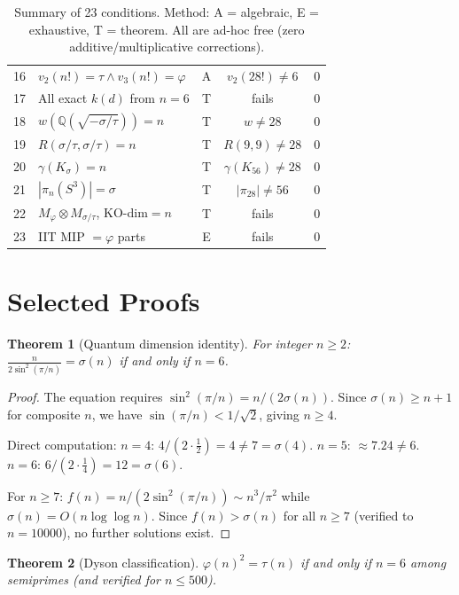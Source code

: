 \documentclass[11pt,a4paper]{article}
\newtheorem{theorem}{Theorem}
\begin{document}
\begin{table}[h!]
\begin{tabular}{@{}clccc@{}}
16 & $v_2(n!)=\tau \wedge v_3(n!)=\varphi$ & A & $v_2(28!)\neq 6$ & 0 \\
17 & All exact $k(d)$ from $n=6$ & T & fails & 0 \\
18 & $w(\mathbb{Q}(\sqrt{-\sigma/\tau})) = n$ & T & $w\neq 28$ & 0 \\
19 & $R(\sigma/\tau,\sigma/\tau) = n$ & T & $R(9,9)\neq 28$ & 0 \\
20 & $\gamma(K_\sigma) = n$ & T & $\gamma(K_{56})\neq 28$ & 0 \\
21 & $|\pi_n(S^3)| = \sigma$ & T & $|\pi_{28}|\neq 56$ & 0 \\
22 & $M_\varphi \otimes M_{\sigma/\tau}$, KO-dim$=n$ & T & fails & 0 \\
23 & IIT MIP $= \varphi$ parts & E & fails & 0 \\
\bottomrule
\end{tabular}
\caption{Summary of 23 conditions. Method: A = algebraic, E = exhaustive, T = theorem. All are ad-hoc free (zero additive/multiplicative corrections).}
\end{table}

\section{Selected Proofs}

\begin{theorem}[Quantum dimension identity]
For integer $n \ge 2$: $\frac{n}{2\sin^2(\pi/n)} = \sigma(n)$ if and only if $n = 6$.
\end{theorem}

\begin{proof}
The equation requires $\sin^2(\pi/n) = n/(2\sigma(n))$. Since $\sigma(n) \ge n+1$ for composite $n$, we have $\sin(\pi/n) < 1/\sqrt{2}$, giving $n \ge 4$.

Direct computation: $n=4$: $4/(2\cdot\tfrac{1}{2}) = 4 \neq 7 = \sigma(4)$. $n=5$: $\approx 7.24 \neq 6$. $n=6$: $6/(2\cdot\tfrac{1}{4}) = 12 = \sigma(6)$. \checkmark

For $n \ge 7$: $f(n) = n/(2\sin^2(\pi/n)) \sim n^3/\pi^2$ while $\sigma(n) = O(n\log\log n)$. Since $f(n) > \sigma(n)$ for all $n \ge 7$ (verified to $n=10000$), no further solutions exist.
\end{proof}

\begin{theorem}[Dyson classification]
$\varphi(n)^2 = \tau(n)$ if and only if $n = 6$ among semiprimes (and verified for $n \le 500$).
\end{theorem}
\end{document}
